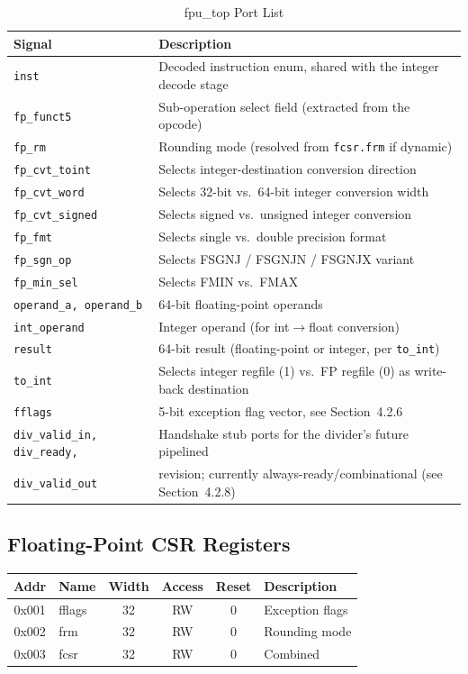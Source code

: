 \begin{table}[H]
\centering
\caption{fpu\_top Port List}
\begin{tabular}{|l|l|}
\hline
\textbf{Signal} & \textbf{Description} \\ \hline
\texttt{inst} & Decoded instruction enum, shared with the integer decode stage \\ \hline
\texttt{fp\_funct5} & Sub-operation select field (extracted from the opcode) \\ \hline
\texttt{fp\_rm} & Rounding mode (resolved from \texttt{fcsr.frm} if dynamic) \\ \hline
\texttt{fp\_cvt\_toint} & Selects integer-destination conversion direction \\ \hline
\texttt{fp\_cvt\_word} & Selects 32-bit vs.\ 64-bit integer conversion width \\ \hline
\texttt{fp\_cvt\_signed} & Selects signed vs.\ unsigned integer conversion \\ \hline
\texttt{fp\_fmt} & Selects single vs.\ double precision format \\ \hline
\texttt{fp\_sgn\_op} & Selects FSGNJ / FSGNJN / FSGNJX variant \\ \hline
\texttt{fp\_min\_sel} & Selects FMIN vs.\ FMAX \\ \hline
\texttt{operand\_a, operand\_b} & 64-bit floating-point operands \\ \hline
\texttt{int\_operand} & Integer operand (for int$\to$float conversion) \\ \hline
\texttt{result} & 64-bit result (floating-point or integer, per \texttt{to\_int}) \\ \hline
\texttt{to\_int} & Selects integer regfile (1) vs.\ FP regfile (0) as write-back destination \\ \hline
\texttt{fflags} & 5-bit exception flag vector, see Section~4.2.6 \\ \hline
\texttt{div\_valid\_in, div\_ready,} & Handshake stub ports for the divider's future pipelined \\
\texttt{div\_valid\_out} & revision; currently always-ready/combinational (see Section~4.2.8) \\ \hline
\end{tabular}
\end{table}
\subsection{Floating-Point CSR Registers}

\begin{table}[H]
\centering
\begin{tabular}{|c|l|c|c|c|l|}
\hline
\textbf{Addr} & \textbf{Name} & \textbf{Width} & \textbf{Access} & \textbf{Reset} & \textbf{Description} \\ \hline
0x001 & fflags & 32 & RW & 0 & Exception flags \\ \hline
0x002 & frm & 32 & RW & 0 & Rounding mode \\ \hline
0x003 & fcsr & 32 & RW & 0 & Combined \\ \hline
\end{tabular}
\end{table}


